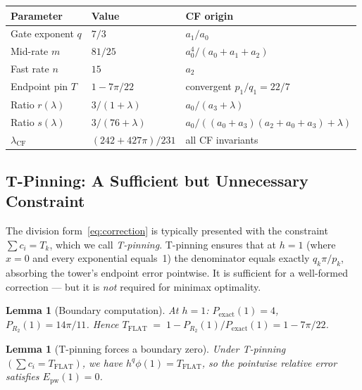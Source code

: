 \documentclass[12pt]{article}
\newtheorem{lemma}[theorem]{Lemma}
\begin{document}
\begin{center}
\begin{tabular}{lll}
\toprule
Parameter & Value & CF origin \\
\midrule
Gate exponent $q$ & $7/3$ & $a_1/a_0$ \\
Mid-rate $m$ & $81/25$ & $a_0^4/(a_0{+}a_1{+}a_2)$ \\
Fast rate $n$ & $15$ & $a_2$ \\
Endpoint pin $T$ & $1-7\pi/22$ & convergent $p_1/q_1 = 22/7$ \\
Ratio $r(\lambda)$ & $3/(1{+}\lambda)$ & $a_0/(a_3{+}\lambda)$ \\
Ratio $s(\lambda)$ & $3/(76{+}\lambda)$ & $a_0/((a_0{+}a_3)(a_2{+}a_0{+}a_3){+}\lambda)$ \\
$\lambda_{\text{CF}}$ & $(242{+}427\pi)/231$ & all CF invariants \\
\bottomrule
\end{tabular}
\end{center}

\subsection{T-Pinning: A Sufficient but Unnecessary Constraint}\label{sec:tpin}

The division form~\eqref{eq:correction} is typically presented with the constraint $\sum c_i = T_k$,
which we call \emph{T-pinning}.  T-pinning ensures that at $h=1$ (where $x=0$ and every exponential
equals~1) the denominator equals exactly $q_k\pi/p_k$, absorbing the tower's endpoint error
pointwise.  It is sufficient for a well-formed correction --- but it is \emph{not} required for
minimax optimality.

\begin{lemma}[Boundary computation]\label{lem:boundary}
At $h=1$: $P_{\mathrm{exact}}(1) = 4$, $P_{R_2}(1) = 14\pi/11$.  Hence
$T_{\mathrm{FLAT}} \;=\; 1 - P_{R_2}(1)/P_{\mathrm{exact}}(1) = 1 - 7\pi/22$.
\end{lemma}

\begin{lemma}[T-pinning forces a boundary zero]\label{lem:tpin-zero}
Under T-pinning $(\sum c_i = T_{\mathrm{FLAT}})$, we have $h^q\phi(1)=T_{\mathrm{FLAT}}$,
so the pointwise relative error satisfies $E_{\mathrm{pw}}(1)=0$.
\end{lemma}
\end{document}
